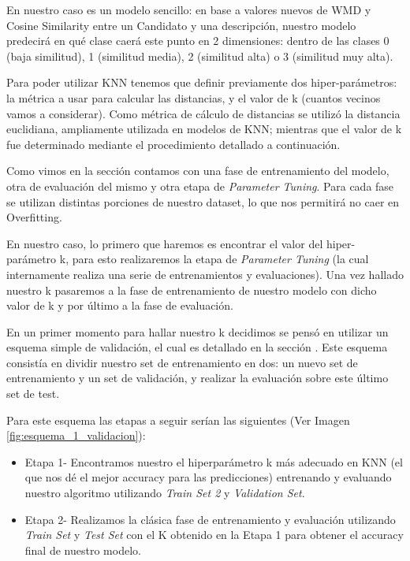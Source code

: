 \documentclass[12pt,a4paper]{article}
\begin{document}
\begin{sloppypar}
En nuestro caso es un modelo sencillo: en base a valores nuevos de WMD y Cosine Similarity entre un Candidato y una descripción, nuestro modelo predecirá en qué clase caerá este punto en 2 dimensiones: dentro de las clases 0 (baja similitud), 1 (similitud media), 2 (similitud alta) o 3 (similitud muy alta). 

Para poder utilizar KNN tenemos que definir previamente dos hiper-parámetros: la métrica a usar para calcular las distancias, y el valor de k (cuantos vecinos vamos a considerar). Como métrica de cálculo de distancias se utilizó la distancia euclidiana, ampliamente utilizada en modelos de KNN; mientras que el valor de k fue determinado mediante el procedimiento detallado a continuación. 

Como vimos en la sección \textit{} contamos con una fase de entrenamiento del modelo, otra de evaluación del mismo y otra etapa de \textit{Parameter Tuning}. Para cada fase se utilizan distintas porciones de nuestro dataset, lo que nos permitirá no caer en Overfitting. 

En nuestro caso, lo primero que haremos es encontrar el valor del hiper-parámetro k, para esto realizaremos la etapa de \textit{Parameter Tuning} (la cual internamente realiza una serie de entrenamientos y evaluaciones). Una vez hallado nuestro k pasaremos a la fase de entrenamiento de nuestro modelo con dicho valor de k y por último a la fase de evaluación. 

En un primer momento para hallar nuestro k decidimos se pensó en utilizar un esquema simple de validación, el cual es detallado en la sección \textit{}. Este esquema consistía en dividir nuestro set de entrenamiento en dos: un nuevo set de entrenamiento y un set de validación, y realizar la evaluación sobre este último set de test.

Para este esquema las etapas a seguir serían las siguientes (Ver Imagen \ref{fig:esquema_1_validacion}):

\begin{itemize}
\item Etapa 1- Encontramos nuestro el hiperparámetro k más adecuado en KNN (el que nos dé el mejor accuracy para las predicciones) entrenando y evaluando nuestro algoritmo utilizando \textit{Train Set 2} y \textit{Validation Set}.

\item Etapa 2- Realizamos la clásica fase de entrenamiento y evaluación utilizando \textit{Train Set} y \textit{Test Set} con el K obtenido en la Etapa 1 para obtener el accuracy final de nuestro modelo.


\end{itemize}
\end{sloppypar}
\end{document}
